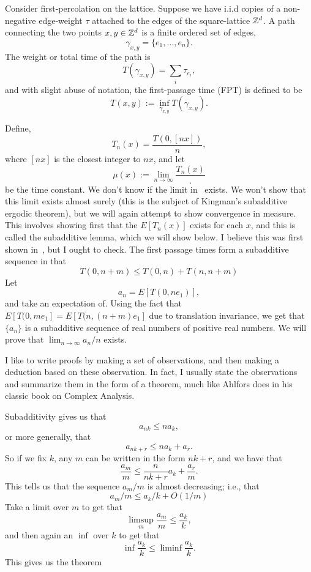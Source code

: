 \begin{example}
Consider first-percolation on the lattice. Suppose we have i.i.d copies of a non-negative edge-weight $\tau$ attached to the edges of the square-lattice $\mathbb{Z}^d$. A path connecting the two points $x , y \in \mathbb{Z}^d$ is a finite ordered set of edges,
\[ \gamma_{x,y} = \{e_1,\ldots,e_n\}.\]
The weight or total time of the path is  
\[ T(\gamma_{x,y}) = \sum_{i} \tau_{e_i}, \]
and with slight abuse of notation, the first-passage time (FPT) is defined to be
\begin{equation}
  T(x,y) := \inf_{\gamma_{x,y}} T(\gamma_{x,y}).
  \label{eq:definition-of-first-passage-time}
\end{equation}

Define, 
\[ T_n(x) = \frac{T(0,[nx])}{n}, \]
where $[nx]$ is the closest integer to $nx$, and let
\begin{equation}
  \mu(x) := \lim_{n \to \infty} \frac{T_n(x)}.
  \label{eq:time-constant}
\end{equation}
be the time constant.  We don't know if the limit in~ exists. We won't show that this limit exists almost surely (this is the subject of Kingman's subadditive ergodic theorem), but we will again attempt to show convergence in measure. This involves showing first that the $E[T_n(x)]$ exists for each $x$, and this is called the subadditive lemma, which we will show below. I believe this was first shown in~\citet{hammersley_first-passage_1965}, but I ought to check. The first passage times form a subadditive sequence in that 
\begin{equation}
  T(0,n+m) \leq T(0,n) + T(n,n+m)
  \label{eq:subadditivity-of-FPT}
\end{equation}
Let
\[ a_n = E[T(0,ne_1)], \]
and take an expectation of. Using the fact that $E[T(0,me_1] = E[T(n,(n+m)e_1]$ due to translation invariance, we get that $\{a_n\}$ is a subadditive sequence of real numbers of positive real numbers. We will prove that $\lim_{n \to \infty} a_n/n$ exists.

I like to write proofs by making a set of observations, and then making a deduction based on these observation. In fact, I usually state the observations and summarize them in the form of a theorem, much like Ahlfors does in his classic book on Complex Analysis. 

Subadditivity gives us that
\[ a_{n k} \leq n a_k, \]
or more generally, that
\[ a_{nk + r} \leq n a_k + a_r. \]
So if we fix $k$, any $m$ can be written in the form $nk+ r$, and we have that
\[ \frac{a_m}{m} \leq \frac{n}{nk+r} a_k + \frac{a_r}{m}. \]
This tells us that the sequence $a_m/m$ is almost decreasing; i.e., that 
\[ a_m/m \leq a_k/k + O(1/m) \]
Take a limit over $m$ to get that
\[ \limsup_m \frac{a_m}{m} \leq \frac{a_k}{k}, \]
and then again an $\inf$ over $k$ to get that
\[ \inf \frac{a_k}{k} \leq \liminf \frac{a_k}{k}. \]
This gives us the theorem


\end{example}
